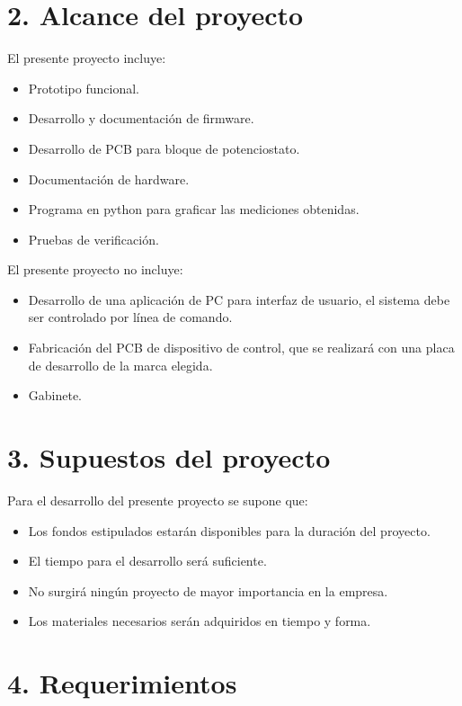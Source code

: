 \documentclass[11pt]{charter}
\begin{document}
\section{2. Alcance del proyecto}
\label{sec:alcance}

El presente proyecto incluye:
\begin{itemize}
\item Prototipo funcional.
\item Desarrollo y documentación de firmware.
\item Desarrollo de PCB para bloque de potenciostato.
\item Documentación de hardware.
\item Programa en python para graficar las mediciones obtenidas.  
\item Pruebas de verificación.
\end{itemize}

El presente proyecto no incluye:
\begin{itemize}
\item Desarrollo de una aplicación de PC para interfaz de usuario, el sistema debe ser controlado por línea de comando.
\item Fabricación del PCB de dispositivo de control, que se realizará con una placa de desarrollo de la marca elegida.
\item Gabinete.
\end{itemize}


\section{3. Supuestos del proyecto}
\label{sec:supuestos}
Para el desarrollo del presente proyecto se supone que:
\begin{itemize}
\item Los fondos estipulados estarán disponibles para la duración del proyecto.
\item El tiempo para el desarrollo será suficiente.
\item No surgirá ningún proyecto de mayor importancia en la empresa.
\item Los materiales necesarios serán adquiridos en tiempo y forma.
\end{itemize}

\section{4. Requerimientos}
\label{sec:requerimientos}
\end{document}
